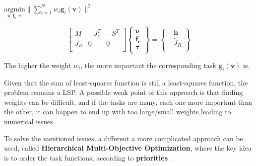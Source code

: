 \begin{center}
$\underset{\bm{\dot{\nu},f_{c},\bm{\tau}}}{\text{argmin}} \| \sum_{i=1}^{N} w_i \mathbf{g}_{i}(\mathbf{v}) \|^{2}$


\end{center}

\begin{equation}
\begin{bmatrix} 
M & -J_{c}^{T} & -S^{T}  \\
J_{R} & 0 & 0  \\
\end{bmatrix} 
\begin{Bmatrix} 
\bm{\dot{\nu}} \\
\mathbf{f_{c}} \\
\bm{\tau}  \\
\end{Bmatrix} 
= 
\begin{Bmatrix} 
-\mathbf{h} \\
-\dot{J}_{R} \\
\end{Bmatrix}
\label{eq: First Multi-task QP-setup}
\end{equation}

The higher the weight $w_{i}$, the more important the corresponding task $\mathbf{g}_{i}(\mathbf{v})$ is. 

Given that the sum of least-squares function is still a least-squares function, the problem remains a LSP.
A possible weak point of this approach is that finding weights can be difficult, and if the tasks are many, each one more important than the other, it can happen to end up with too large/small weights leading to numerical issues.

To solve the mentioned issues, a different a more complicated 
approach can be used, called \textbf{Hierarchical Multi-Objective Optimization}, where the key idea is to order the task functions, according to \textbf{priorities} \cite{Romano2015WholebodyFC}\cite{Escande2014HierarchicalQP}.

